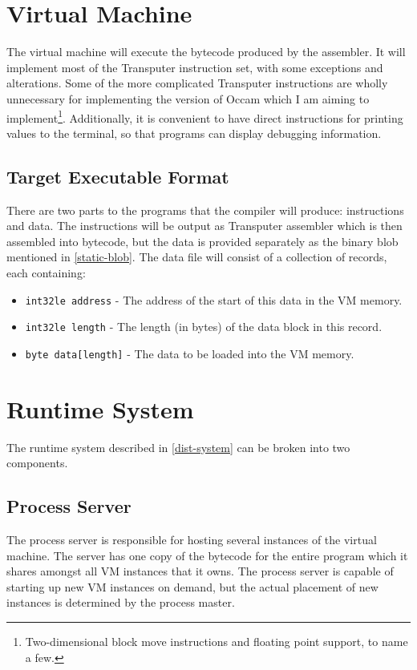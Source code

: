 \section{Virtual Machine}

The virtual machine will execute the bytecode produced by the assembler. It will
implement most of the Transputer instruction set, with some exceptions and
alterations. Some of the more complicated Transputer instructions are wholly
unnecessary for implementing the version of Occam which I am aiming to
implement\footnote{Two-dimensional block move instructions and floating point
support, to name a few.}. Additionally, it is convenient to have direct
instructions for printing values to the terminal, so that programs can display
debugging information.

\subsection{Target Executable Format} \label{binary-format}

There are two parts to the programs that the compiler will produce:
instructions and data. The instructions will be output as Transputer assembler
which is then assembled into bytecode, but the data is provided separately as
the binary blob mentioned in \ref{static-blob}. The data file will consist of a
collection of records, each containing:
\begin{itemize}
  \item
    \texttt{int32le address} - The address of the start of this data in the VM
    memory.
  \item
    \texttt{int32le length} - The length (in bytes) of the data block in this
    record.
  \item
    \texttt{byte data[length]} - The data to be loaded into the VM memory.
\end{itemize}

\section{Runtime System}

The runtime system described in \ref{dist-system} can be broken into two
components.

\subsection{Process Server}

The process server is responsible for hosting several instances of the virtual
machine. The server has one copy of the bytecode for the entire program which it
shares amongst all VM instances that it owns. The process server is capable of
starting up new VM instances on demand, but the actual placement of new
instances is determined by the process master.

